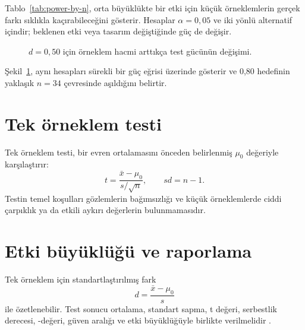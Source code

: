 Tablo~\ref{tab:power-by-n}, orta büyüklükte bir etki için küçük örneklemlerin
gerçek farkı sıklıkla
kaçırabileceğini gösterir. Hesaplar $\alpha=0{,}05$ ve iki yönlü alternatif
içindir; beklenen etki veya tasarım değiştiğinde güç de değişir.

\begin{figure}[H]
\centering
{}
\caption{$d=0{,}50$ için örneklem hacmi arttıkça test gücünün değişimi.}
\label{fig:power-curve}
\end{figure}

Şekil~\ref{fig:power-curve}, aynı hesapları sürekli bir güç eğrisi üzerinde
gösterir ve 0,80 hedefinin yaklaşık $n=34$ çevresinde aşıldığını belirtir.

\section{Tek örneklem \tstat testi}
\label{sec:one-sample-t}

Tek örneklem \tstat testi, bir evren ortalamasını önceden belirlenmiş $\mu_0$
değeriyle karşılaştırır:
\[
t=\frac{\bar x-\mu_0}{s/\sqrt n},\qquad sd=n-1.
\]
Testin temel koşulları gözlemlerin bağımsızlığı ve küçük örneklemlerde ciddi
çarpıklık ya da etkili aykırı değerlerin bulunmamasıdır.

\section{Etki büyüklüğü ve raporlama}

Tek örneklem için standartlaştırılmış fark
\[
d=\frac{\bar x-\mu_0}{s}
\]
ile özetlenebilir. Test sonucu ortalama, standart sapma, t değeri, serbestlik
derecesi, \pval-değeri, güven aralığı ve etki büyüklüğüyle birlikte verilmelidir
\citep{lakens2013}.

